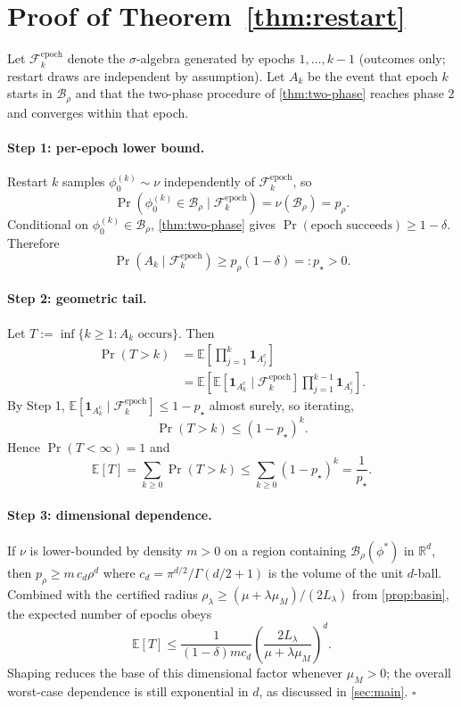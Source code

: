 \documentclass{article}
\theoremstyle{plain}
\theoremstyle{definition}
\theoremstyle{remark}
\newcommand{\E}{\mathbb{E}}
\newcommand{\R}{\mathbb{R}}
\newcommand{\B}{\mathcal{B}}
\newcommand{\F}{\mathcal{F}}
\begin{document}
\section{Proof of Theorem~\ref{thm:restart}}\label{app:thm-restart}

Let $\F_k^{\mathrm{epoch}}$ denote the $\sigma$-algebra generated by epochs $1,\ldots,k-1$ (outcomes only; restart draws are independent by assumption). Let $A_k$ be the event that epoch $k$ starts in $\B_\rho$ and that the two-phase procedure of \cref{thm:two-phase} reaches phase 2 and converges within that epoch.

\paragraph{Step 1: per-epoch lower bound.}
Restart $k$ samples $\phi_0^{(k)}\sim\nu$ independently of $\F_k^{\mathrm{epoch}}$, so
\[
\Pr(\phi_0^{(k)}\in\B_\rho\mid\F_k^{\mathrm{epoch}})=\nu(\B_\rho)=p_\rho.
\]
Conditional on $\phi_0^{(k)}\in\B_\rho$, \cref{thm:two-phase} gives $\Pr(\text{epoch succeeds})\ge 1-\delta$. Therefore
\[
\Pr(A_k\mid\F_k^{\mathrm{epoch}})\ge p_\rho(1-\delta)=:p_\star>0.
\]

\paragraph{Step 2: geometric tail.}
Let $T:=\inf\{k\ge 1:A_k\text{ occurs}\}$. Then
\[
\begin{aligned}
\Pr(T>k)
&=\E\!\left[\prod_{j=1}^k\mathbf{1}_{A_j^c}\right] \\
&=\E\!\left[
\E[\mathbf{1}_{A_k^c}\mid\F_k^{\mathrm{epoch}}]
\prod_{j=1}^{k-1}\mathbf{1}_{A_j^c}
\right].
\end{aligned}
\]
By Step 1, $\E[\mathbf{1}_{A_k^c}\mid\F_k^{\mathrm{epoch}}]\le 1-p_\star$ almost surely, so iterating,
\[
\Pr(T>k)\le (1-p_\star)^k.
\]
Hence $\Pr(T<\infty)=1$ and
\[
\E[T]=\sum_{k\ge 0}\Pr(T>k)\le \sum_{k\ge 0}(1-p_\star)^k=\frac{1}{p_\star}.
\]

\paragraph{Step 3: dimensional dependence.}
If $\nu$ is lower-bounded by density $m>0$ on a region containing $\B_\rho(\phi^\ast)$ in $\R^d$, then $p_\rho\ge m\,c_d\rho^d$ where $c_d=\pi^{d/2}/\Gamma(d/2+1)$ is the volume of the unit $d$-ball. Combined with the certified radius $\rho_\lambda\ge (\mu+\lambda\mu_M)/(2L_\lambda)$ from \cref{prop:basin}, the expected number of epochs obeys
\[
\E[T]\le \frac{1}{(1-\delta)m c_d}\!\left(\frac{2L_\lambda}{\mu+\lambda\mu_M}\right)^{\!d}.
\]
Shaping reduces the base of this dimensional factor whenever $\mu_M>0$; the overall worst-case dependence is still exponential in $d$, as discussed in \cref{sec:main}. $\square$
\end{document}
